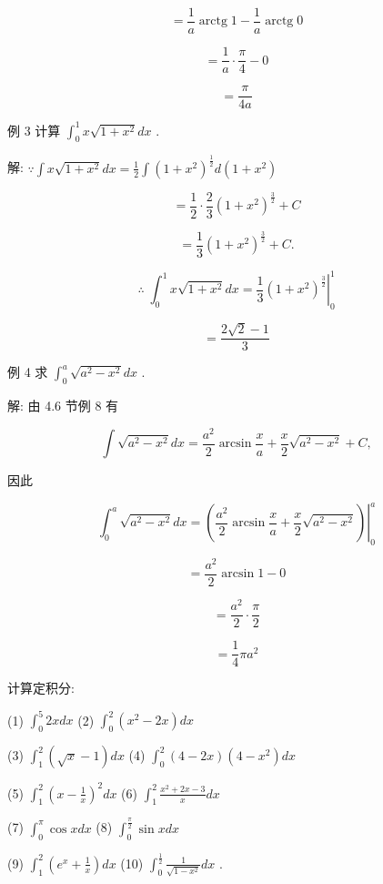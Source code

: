 \documentclass[lang=cn,newtx,10pt,scheme=chinese]{elegantbook}
\begin{document}
\[
= \frac{1}{a}\operatorname{arctg}1 - \frac{1}{a}\operatorname{arctg}0
\]

\[
= \frac{1}{a} \cdot \frac{\pi }{4} - 0
\]

\[
= \frac{\pi }{4a}
\]

例 3 计算 \({\int }_{0}^{1}x\sqrt{1 + {x}^{2}}{dx}\) .

解: \(\because \int x\sqrt{1 + {x}^{2}}{dx} = \frac{1}{2}\int {\left( 1 + {x}^{2}\right) }^{\frac{1}{2}}d\left( {1 + {x}^{2}}\right)\)

\[
= \frac{1}{2} \cdot \frac{2}{3}{\left( 1 + {x}^{2}\right) }^{\frac{3}{2}} + C
\]

\[
= \frac{1}{3}{\left( 1 + {x}^{2}\right) }^{\frac{3}{2}} + C\text{.}
\]

\[
\therefore \;{\int }_{0}^{1}x\sqrt{1 + {x}^{2}}{dx} = {\left. \frac{1}{3}{\left( 1 + {x}^{2}\right) }^{\frac{3}{2}}\right| }_{0}^{1}
\]

\[
= \frac{2\sqrt{2} - 1}{3}
\]

例 4 求 \({\int }_{0}^{a}\sqrt{{a}^{2} - {x}^{2}}{dx}\) .

解: 由 4.6 节例 8 有

\[
\int \sqrt{{a}^{2} - {x}^{2}}{dx} = \frac{{a}^{2}}{2}\arcsin \frac{x}{a} + \frac{x}{2}\sqrt{{a}^{2} - {x}^{2}} + C,
\]

因此

\[
{\int }_{0}^{a}\sqrt{{a}^{2} - {x}^{2}}{dx} = {\left. \left( \frac{{a}^{2}}{2}\arcsin \frac{x}{a} + \frac{x}{2}\sqrt{{a}^{2} - {x}^{2}}\right) \right| }_{0}^{a}
\]

\[
= \frac{{a}^{2}}{2}\arcsin 1 - 0
\]

\[
= \frac{{a}^{2}}{2} \cdot \frac{\pi }{2}
\]

\[
= \frac{1}{4}\pi {a}^{2}
\]

\begin{problemset}[练习]

\item 计算定积分:

(1) \({\int }_{0}^{5}{2xdx}\) (2) \({\int }_{0}^{2}\left( {{x}^{2} - {2x}}\right) {dx}\)

(3) \({\int }_{1}^{2}\left( {\sqrt{x} - 1}\right) {dx}\) (4) \({\int }_{0}^{2}\left( {4 - {2x}}\right) \left( {4 - {x}^{2}}\right) {dx}\)

(5) \({\int }_{1}^{2}{\left( x - \frac{1}{x}\right) }^{2}{dx}\) (6) \({\int }_{1}^{2}\frac{{x}^{2} + {2x} - 3}{x}{dx}\)

(7) \({\int }_{0}^{\pi }\cos {xdx}\) (8) \({\int }_{0}^{\frac{\pi }{2}}\sin {xdx}\)

(9) \({\int }_{1}^{2}\left( {{e}^{x} + \frac{1}{x}}\right) {dx}\) (10) \({\int }_{0}^{\frac{1}{2}}\frac{1}{\sqrt{1 - {x}^{2}}}{dx}\) .

\end{problemset}
\end{document}
